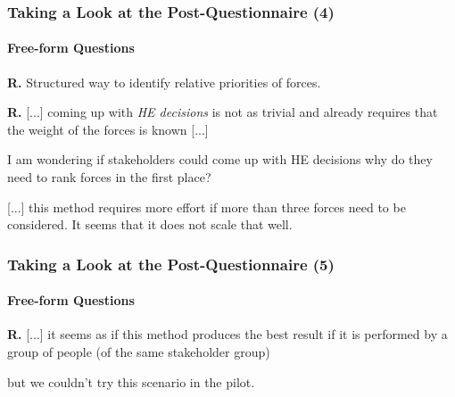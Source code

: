 \documentclass{beamer}
\begin{document}
\begin{frame}\frametitle{Taking a Look at the Post-Questionnaire (4)}
  \framesubtitle{Free-form Questions}
  \begin{minipage}{10.8cm} 
  \end{minipage}

  \textbf{R.} Structured way to identify relative priorities of forces.

  \vspace{.3cm}
  \begin{minipage}{10.8cm} 
  \end{minipage}
  \begin{minipage}{10.80cm}
    \textbf{R.} [...] coming up with \emph{HE decisions} is not as trivial and 
    already requires that the weight of the forces is known [...]
    \vspace{0.2cm}
    \par {}
    I am wondering if stakeholders could come up with HE decisions 
    why do they need to rank forces in the first place? 
    \vspace{0.2cm}
    \par {}
    [...] this method requires more effort if more than three forces 
    need to be considered. It seems that it does not scale that well.

  \end{minipage}
\end{frame}


\begin{frame}\frametitle{Taking a Look at the Post-Questionnaire (5)}
  \framesubtitle{Free-form Questions}
  \begin{minipage}{10.8cm} 
  \end{minipage}

  \begin{minipage}{10.8cm}
    \vspace{.15cm}
    \textbf{R.} [...] it seems as if this method produces the best result if it is performed by a group of people 
  (of the same stakeholder group)\newline 
  \par [...] but we couldn't try this scenario in the pilot.
  \end{minipage}

\end{frame}
\end{document}
